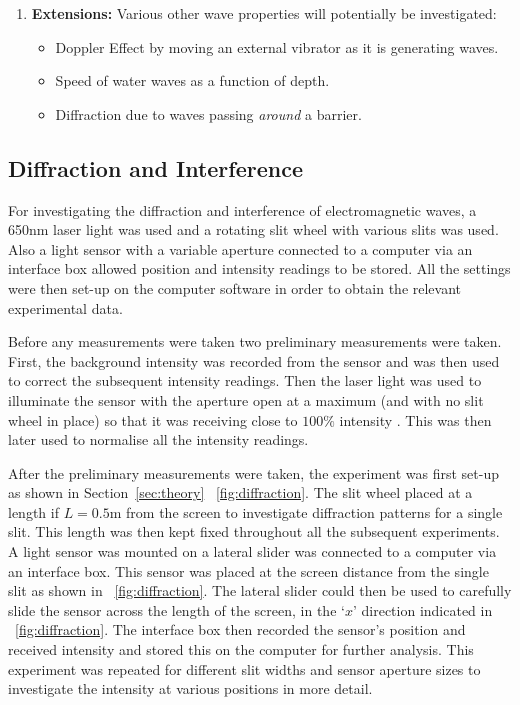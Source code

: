 \documentclass{article}
\newcommand{\figref}[2][\figurename~]{#1\ref{#2}}
\newcommand{\secref}[2][Section~]{#1\ref{#2}}
\begin{document}
\begin{enumerate}
  \item \textbf{Extensions:} Various other wave properties will potentially be investigated:
  	\begin{itemize}
     \item Doppler Effect by moving an external vibrator as it is generating waves.
     \item Speed of water waves as a function of depth.
     \item Diffraction due to waves passing \textit{around} a barrier.
   \end{itemize}
\end{enumerate}

\subsection{Diffraction and Interference}
\label{ssec:diffraction-method}

For investigating the diffraction and interference of electromagnetic waves, a 650nm laser light was used \cite{Paper02} and a rotating slit wheel with various slits was used. Also a light sensor with a variable aperture connected to a computer via an interface box allowed position and intensity readings to be stored. All the settings were then set-up on the computer software in order to obtain the relevant experimental data. 

\vspace{2mm}
\noindent
Before any measurements were taken two preliminary measurements were taken. First, the background intensity was recorded from the sensor and was then used to correct the subsequent intensity readings. Then the laser light was used to illuminate the sensor with the aperture open at a maximum (and with no slit wheel in place) so that it was receiving close to $100\%$ intensity \cite{Paper01}. This was then later used to normalise all the intensity readings.

\vspace{2mm}
\noindent
After the preliminary measurements were taken, the experiment was first set-up as shown in \secref{sec:theory} \figref{fig:diffraction}. The slit wheel placed at a length if $L = 0.5$m from the screen to investigate diffraction patterns for a single slit. This length was then kept fixed throughout all the subsequent experiments. A light sensor was mounted on a lateral slider was connected to a computer via an interface box. This sensor was placed at the screen distance from the single slit as shown in \figref{fig:diffraction}. The lateral slider could then be used to carefully slide the sensor across the length of the screen, in the `$x$' direction indicated in \figref{fig:diffraction}. The interface box then recorded the sensor's position and received intensity and stored this on the computer for further analysis. This experiment was repeated for different slit widths and sensor aperture sizes to investigate the intensity at various positions in more detail.
\end{document}
